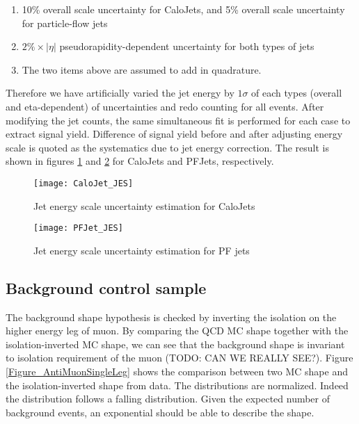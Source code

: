 \documentclass{cmspaper}
\begin{document}
\begin{enumerate}
\item 10\% overall scale uncertainty for CaloJets, and 5\% overall
  scale uncertainty for particle-flow jets
\item $2\% \times |\eta|$ pseudorapidity-dependent uncertainty for
  both types of jets
\item The two items above are assumed to add in quadrature.
\end{enumerate}

Therefore we have artificially varied the jet energy by $1 \sigma$ of
each types (overall and eta-dependent) of uncertainties and redo
counting for all events.  After modifying the jet counts, the same
simultaneous fit is performed for each case to extract signal yield.
Difference of signal yield before and after adjusting energy scale is
quoted as the systematics due to jet energy correction.  The result is
shown in figures \ref{Figure_CaloJetJES} and \ref{Figure_PFJetJES} for
CaloJets and PFJets, respectively.

\begin{figure}[hbtp]
\begin{center}
\texttt{[image: CaloJet\_JES]}
\caption{Jet energy scale uncertainty estimation for CaloJets}
\label{Figure_CaloJetJES}
\end{center}
\end{figure}

\begin{figure}[hbtp]
\begin{center}
\texttt{[image: PFJet\_JES]}
\caption{Jet energy scale uncertainty estimation for PF jets}
\label{Figure_PFJetJES}
\end{center}
\end{figure}


\subsection{Background control sample}

The background shape hypothesis is checked by inverting the isolation
on the higher energy leg of muon.  By comparing the QCD MC shape
together with the isolation-inverted MC shape, we can see that the
background shape is invariant to isolation requirement of the muon
(TODO: CAN WE REALLY SEE?).  Figure \ref{Figure_AntiMuonSingleLeg}
shows the comparison between two MC shape and the isolation-inverted
shape from data.  The distributions are normalized.  Indeed the
distribution follows a falling distribution.  Given the expected
number of background events, an exponential should be able to describe
the shape.
\end{document}
